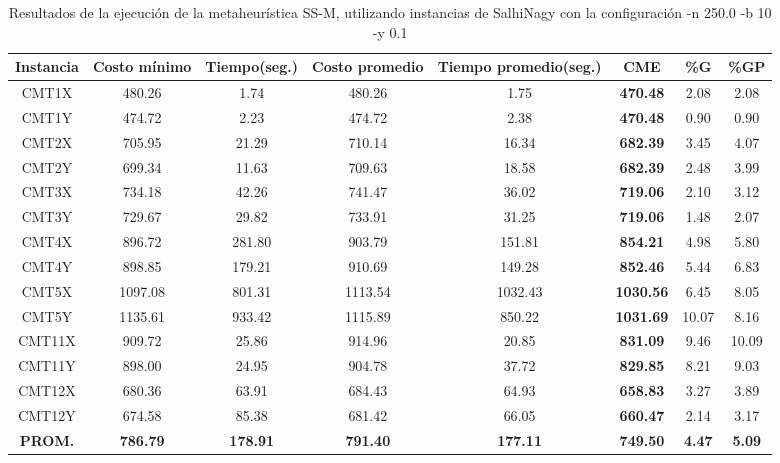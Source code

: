 \begin{table}[h]
\caption{Resultados de la ejecución de la metaheurística SS-M, utilizando instancias de SalhiNagy con la configuración -n 250.0 -b 10 -y 0.1}
\centering
\small
\begin{tabular}{c c c c c c c c}
\hline\hline
Instancia & Costo mínimo & Tiempo(seg.) & Costo promedio & Tiempo promedio(seg.) & CME & \%G & \%GP \\ [0.5ex]
\hline
CMT1X & 480.26 & 1.74 & 
480.26 & 1.75 & \bf{470.48} & 
2.08 & 2.08\\CMT1Y & 474.72 & 2.23 & 
474.72 & 2.38 & \bf{470.48} & 
0.90 & 0.90\\CMT2X & 705.95 & 21.29 & 
710.14 & 16.34 & \bf{682.39} & 
3.45 & 4.07\\CMT2Y & 699.34 & 11.63 & 
709.63 & 18.58 & \bf{682.39} & 
2.48 & 3.99\\CMT3X & 734.18 & 42.26 & 
741.47 & 36.02 & \bf{719.06} & 
2.10 & 3.12\\CMT3Y & 729.67 & 29.82 & 
733.91 & 31.25 & \bf{719.06} & 
1.48 & 2.07\\CMT4X & 896.72 & 281.80 & 
903.79 & 151.81 & \bf{854.21} & 
4.98 & 5.80\\CMT4Y & 898.85 & 179.21 & 
910.69 & 149.28 & \bf{852.46} & 
5.44 & 6.83\\CMT5X & 1097.08 & 801.31 & 
1113.54 & 1032.43 & \bf{1030.56} & 
6.45 & 8.05\\CMT5Y & 1135.61 & 933.42 & 
1115.89 & 850.22 & \bf{1031.69} & 
10.07 & 8.16\\CMT11X & 909.72 & 25.86 & 
914.96 & 20.85 & \bf{831.09} & 
9.46 & 10.09\\CMT11Y & 898.00 & 24.95 & 
904.78 & 37.72 & \bf{829.85} & 
8.21 & 9.03\\CMT12X & 680.36 & 63.91 & 
684.43 & 64.93 & \bf{658.83} & 
3.27 & 3.89\\CMT12Y & 674.58 & 85.38 & 
681.42 & 66.05 & \bf{660.47} & 
2.14 & 3.17\\\bf{PROM.} & 
\bf{786.79} & \bf{178.91} & \bf{791.40} & \bf{177.11} & \bf{749.50} & \bf{4.47} & \bf{5.09}\\[1ex]\hline
\end{tabular}
\label{table:SS-M-250-0.1-S}
\end{table}

